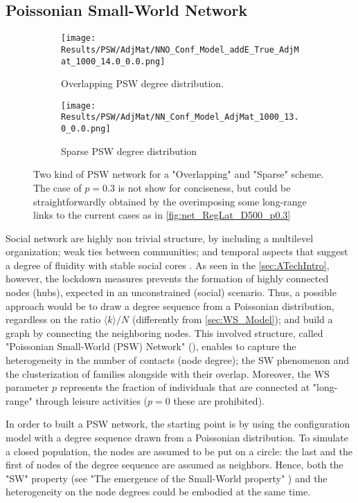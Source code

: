 \documentclass[a4paper,10pt,twoside]{book} %
\theoremstyle{definition}
\begin{document}
\subsection{Poissonian Small-World Network}
\label{sec:PSW_network}
\begin{figure}[ht]
    \begin{subfigure}{.45\linewidth}
        \texttt{[image: Results/PSW/AdjMat/NNO\_Conf\_Model\_addE\_True\_AdjMat\_1000\_14.0\_0.0.png]}
        \centering
        \caption{Overlapping PSW degree distribution. }
        \label{fig:netmod_O-PSW}
    \end{subfigure}
	\hfill
	\begin{subfigure}{.45\linewidth}
        \texttt{[image: Results/PSW/AdjMat/NN\_Conf\_Model\_AdjMat\_1000\_13.0\_0.0.png]}
        \centering
        \caption{Sparse PSW degree distribution}
        \label{fig:netmod_S-PSW}
    \end{subfigure}
	\caption{Two kind of PSW network for a "Overlapping" and "Sparse" scheme. The case of $p = 0.3$ is not show for conciseness, but could be straightforwardly obtained by the overimposing some long-range links to the current cases as in \autoref{fig:net_RegLat_D500_p0.3}}
\end{figure}
Social network are highly non trivial structure, by including a multilevel organization; weak ties between communities; and temporal aspects that suggest a degree of fluidity with stable social cores \cite{Thurner::NetBasedExpl}.
As seen in the \autoref{sec:ATechIntro}, however, the lockdown measures prevents the formation of highly connected nodes (hubs), expected in an unconstrained (social) scenario. Thus, a possible approach would be to draw a degree sequence from a Poissonian distribution, regardless on the ratio $\langle k \rangle / N$ (differently from \autoref{sec:WS_Model}); and build a graph by connecting the neighboring nodes.
This involved structure, called "Poissonian Small-World (PSW) Network" (\cite{Thurner::NetBasedExpl}), enables to capture the heterogeneity in the number of contacts (node degree); the SW phenomenon and the clusterization of families alongside with their overlap. Moreover, the WS parameter $p$ represents the fraction of individuals that are connected at "long-range" through leisure activities ($p = 0$ these are prohibited).

In order to built a PSW network, the starting point is by using the configuration model with a degree sequence drawn from a Poissonian distribution. To simulate a closed population, the nodes are assumed to be put on a circle: the last and the first of nodes of the degree sequence are assumed as neighbors. Hence, both the "SW" property (see "The emergence of the Small-World property" ) and the heterogeneity on the node degrees could be embodied at the same time. 
\end{document}
